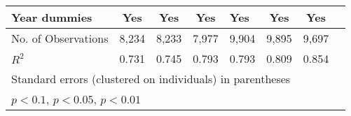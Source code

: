 \begin{longtable}{l*{3}{c}|l*{3}{c}}
	Year dummies        &         Yes         &         Yes         &         Yes         &         Yes         &         Yes         &         Yes         \\
	\midrule
	No. of	Observations        &        8,234         &        8,233         &        7,977         &        9,904         &        9,895         &        9,697         \\
	\(R^{2}\)  &       0.731         &       0.745         &       0.793         &       0.793         &       0.809         &       0.854         \\
	\bottomrule
	\multicolumn{7}{l}{\footnotesize Standard errors (clustered on individuals) in parentheses}\\
	\multicolumn{7}{l}{\footnotesize \sym{*} \(p<0.1\), \sym{**} \(p<0.05\), \sym{***} \(p<0.01\)}
	\label{tab:ru_wage_full}
\end{longtable}
	
\industry\\
\occupation\\
\ownership
